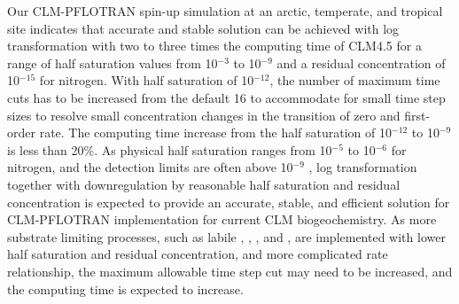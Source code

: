 \documentclass[gmd, manuscript]{copernicus}
\begin{document}
Our CLM-PFLOTRAN spin-up simulation at an arctic, temperate, and tropical site
indicates that accurate and stable solution can be achieved with log
transformation with two to three times the computing time of CLM4.5 for a range of half
saturation values from 10$^{-3}$ to 10$^{-9}$ and a residual concentration of
10$^{-15}$ for nitrogen. With half saturation of 10$^{-12}$, the number of
maximum time cuts has to be increased from the default 16 to accommodate for
small time step sizes to resolve small concentration changes in the transition
of zero and first-order rate. The computing time increase from the half
saturation of 10$^{-12}$ to 10$^{-9}$ is less than 20\%. As physical half
saturation ranges from 10$^{-5}$ to 10$^{-6}$  for nitrogen, and the
detection limits are often above 10$^{-9}$ , log transformation
together with downregulation by reasonable half saturation and residual
concentration is expected to provide an accurate, stable, and efficient solution
for CLM-PFLOTRAN implementation for current CLM biogeochemistry. As more
substrate limiting processes, such as labile , , ,
and , are implemented with lower half saturation and residual
concentration, and more complicated rate relationship, the maximum allowable
time step cut may need to be increased, and the computing time is expected to
increase.


\end{document}
